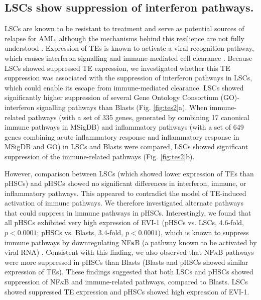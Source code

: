 \subsection{LSCs show suppression of interferon pathways.}
LSCs are known to be resistant to treatment and serve as potential sources of relapse for AML, although the mechanisms behind this resilience are not fully understood \cite{Reinisch2015}. Expression of TEs is known to activate a viral recognition pathway, which causes interferon signalling and immune-mediated cell clearance \cite{Chiappinelli2015, Roulois2015}. Because LSCs showed suppressed TE expression, we investigated whether this TE suppression was associated with the suppression of interferon pathways in LSCs, which could enable its escape from immune-mediated clearance. LSCs showed significantly higher suppression of several Gene Ontology Consortium (GO)-interferon signalling pathways than Blasts (Fig. \ref{fig:tes2}a). When immune-related pathways (with a set of 335 genes, generated by combining 17 canonical immune pathways in MSigDB) and inflammatory pathways (with a set of 649 genes combining acute inflammatory response and inflammatory response in MSigDB and GO) in LSCs and Blasts were compared, LSCs showed significant suppression of the immune-related pathways (Fig. \ref{fig:tes2}b).

However, comparison between LSCs (which showed lower expression of TEs than pHSCs) and pHSCs showed no significant differences in interferon, immune, or inflammatory pathways. This appeared to contradict the model of TE-induced activation of immune pathways. We therefore investigated alternate pathways that could suppress in immune pathways in pHSCs. Interestingly, we found that all pHSCs exhibited very high expression of EVI-1 (pHSCs vs. LSCs, 4.6-fold, $p < 0.0001$; pHSCs vs. Blasts, 3.4-fold, $p < 0.0001$), which is known to suppress immune pathways by downregulating NFκB (a pathway known to be activated by viral RNA) \cite{Xu2012}. Consistent with this finding, we also observed that NF$\kappa$B pathways were more suppressed in pHSCs than Blasts (Blasts and pHSCs showed similar expression of TEs). These findings suggested that both LSCs and pHSCs showed suppression of NF$\kappa$B and immune-related pathways, compared to Blasts. LSCs showed suppressed TE expression and pHSCs showed high expression of EVI-1.

